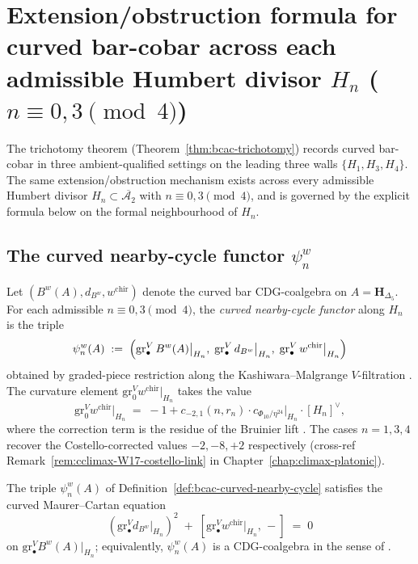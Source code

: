 \section{Extension/obstruction formula for curved bar-cobar across each
admissible Humbert divisor $H_n$ ($n\equiv 0,3\pmod 4$)}
\label{sec:bcac-extension-obstruction-admissible}

The trichotomy theorem
(Theorem~\ref{thm:bcac-trichotomy}) records curved bar-cobar
in three ambient-qualified settings on the leading three walls
$\{H_1,H_3,H_4\}$. The same extension/obstruction mechanism exists
across every admissible Humbert divisor
$H_n\subset\overline{\mathcal{A}_2}$ with $n\equiv 0,3\pmod 4$, and
is governed by the explicit formula below on the formal neighbourhood
of $H_n$.

\subsection{The curved nearby-cycle functor $\psi_n^w$}
\label{subsec:bcac-curved-nearby-cycle}

\begin{definition}
\label{def:bcac-curved-nearby-cycle}
Let $(B^w(A),d_{B^w},w^{\mathrm{chir}})$ denote the curved bar
CDG-coalgebra on $A=\mathbf{H}_{\Delta_5}$. For each admissible
$n\equiv 0,3\pmod 4$, the \emph{curved nearby-cycle functor}
along $H_n$ is the triple
\[
 \psi_n^w(A)
 \;:=\;
 \Bigl(
 \mathrm{gr}^V_\bullet\,B^w(A)\big|_{H_n},\;
 \mathrm{gr}^V_\bullet\, d_{B^w}\big|_{H_n},\;
 \mathrm{gr}^V_\bullet\, w^{\mathrm{chir}}\big|_{H_n}
 \Bigr)
\]
obtained by graded-piece restriction along the
Kashiwara--Malgrange $V$-filtration
\cite{Kashiwara1983,Malgrange1983}. The curvature element
$\mathrm{gr}^V_0 w^{\mathrm{chir}}|_{H_n}$ takes the value
\[
 \mathrm{gr}^V_0 w^{\mathrm{chir}}\big|_{H_n}
 \;=\;
 -1 + c_{-2,1}(n,r_n)\cdot c_{\Phi_{10}/\eta^{24}}\big|_{H_n}
 \cdot [H_n]^\vee,
\]
where the correction term is the residue of the Bruinier lift
\cite{Bruinier2002LNM,GritsenkoNikulin1998}. The cases $n=1,3,4$
recover the Costello-corrected values
$-2,-8,+2$ respectively (cross-ref
Remark~\ref{rem:cclimax-W17-costello-link} in
Chapter~\ref{chap:climax-platonic}).
\end{definition}

\begin{lemma}
\label{lem:bcac-curved-MC-on-nearby-cycle}
\ClaimStatusProvedHere
{}
The triple $\psi_n^w(A)$ of
Definition~\ref{def:bcac-curved-nearby-cycle} satisfies the curved
Maurer--Cartan equation
\[
 (\mathrm{gr}^V_\bullet d_{B^w}|_{H_n})^2
 \;+\;
 [\mathrm{gr}^V_\bullet w^{\mathrm{chir}}|_{H_n},\,-]
 \;=\;
 0
\]
on $\mathrm{gr}^V_\bullet B^w(A)|_{H_n}$; equivalently, $\psi_n^w(A)$
is a CDG-coalgebra in the sense of
\cite[\S4]{Positselski11}.
\end{lemma}

